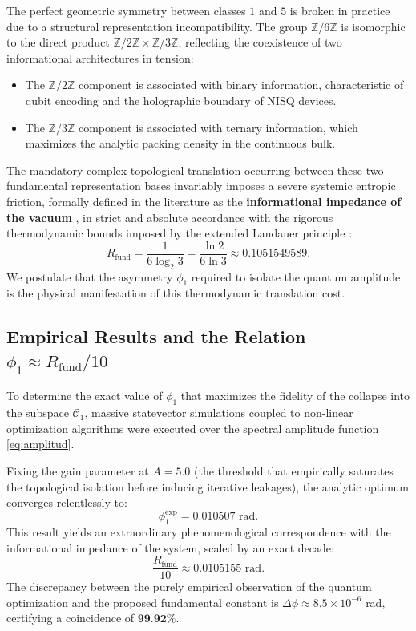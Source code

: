 \documentclass[reprint,aps,pra,superscriptaddress,nofootinbib]{revtex4-2}
\theoremstyle{plain}
\theoremstyle{definition}
\theoremstyle{remark}
\begin{document}
The perfect geometric symmetry between classes $1$ and $5$ is broken in practice due to a structural representation incompatibility. The group $\mathbb{Z}/6\mathbb{Z}$ is isomorphic to the direct product $\mathbb{Z}/2\mathbb{Z} \times \mathbb{Z}/3\mathbb{Z}$, reflecting the coexistence of two informational architectures in tension:
\begin{itemize}
    \item The $\mathbb{Z}/2\mathbb{Z}$ component is associated with binary information, characteristic of qubit encoding and the holographic boundary of NISQ devices.
    \item The $\mathbb{Z}/3\mathbb{Z}$ component is associated with ternary information, which maximizes the analytic packing density in the continuous bulk.
\end{itemize}
The mandatory complex topological translation occurring between these two fundamental representation bases invariably imposes a severe systemic entropic friction, formally defined in the literature as the \textbf{informational impedance of the vacuum} \cite{Peinador_Genesis_e_2025}, in strict and absolute accordance with the rigorous thermodynamic bounds imposed by the extended Landauer principle \cite{Landauer1961}:
\begin{equation}
R_{\text{fund}} = \frac{1}{6\log_2 3} = \frac{\ln 2}{6\ln 3} \approx 0.1051549589.
\label{eq:rfund}
\end{equation}
We postulate that the asymmetry $\phi_1$ required to isolate the quantum amplitude is the physical manifestation of this thermodynamic translation cost.

\subsection{Empirical Results and the Relation $\phi_1 \approx R_{\text{fund}}/10$}

To determine the exact value of $\phi_1$ that maximizes the fidelity of the collapse into the subspace $\mathcal{C}_1$, massive statevector simulations coupled to non-linear optimization algorithms were executed over the spectral amplitude function \eqref{eq:amplitud}. 

Fixing the gain parameter at $A = 5.0$ (the threshold that empirically saturates the topological isolation before inducing iterative leakages), the analytic optimum converges relentlessly to:
\begin{equation}
\phi_1^{\text{exp}} = 0.010507 \text{ rad}.
\end{equation}
This result yields an extraordinary phenomenological correspondence with the informational impedance of the system, scaled by an exact decade:
\begin{equation}
\frac{R_{\text{fund}}}{10} \approx 0.0105155 \text{ rad}.
\end{equation}
The discrepancy between the purely empirical observation of the quantum optimization and the proposed fundamental constant is $\Delta\phi \approx 8.5 \times 10^{-6}$ rad, certifying a coincidence of $\textbf{99.92\%}$. 
\end{document}
